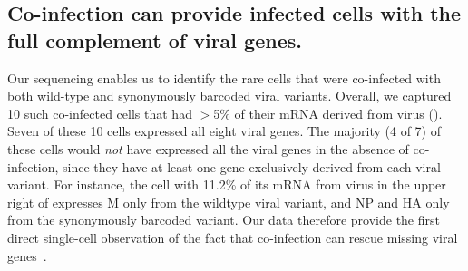 \documentclass[9pt,lineno]{elife}
\begin{document}
\subsection{Co-infection can provide infected cells with the full complement of viral genes.}
Our sequencing enables us to identify the rare cells that were co-infected with both wild-type and synonymously barcoded viral variants.
Overall, we captured 10 such co-infected cells that had $>$5\% of their mRNA derived from virus ().
Seven of these 10 cells expressed all eight viral genes.
The majority (4 of 7) of these cells would \emph{not} have expressed all the viral genes in the absence of co-infection, since they have at least one gene exclusively derived from each viral variant.
For instance, the cell with 11.2\% of its mRNA from virus in the upper right of  expresses M only from the wildtype viral variant, and NP and HA only from the synonymously barcoded variant.
Our data therefore provide the first direct single-cell observation of the fact that co-infection can rescue missing viral genes~\citep{Brooke:2013kb,brooke2014influenza,Fonville:2015cg,aguilera2017plaques}.
\end{document}
